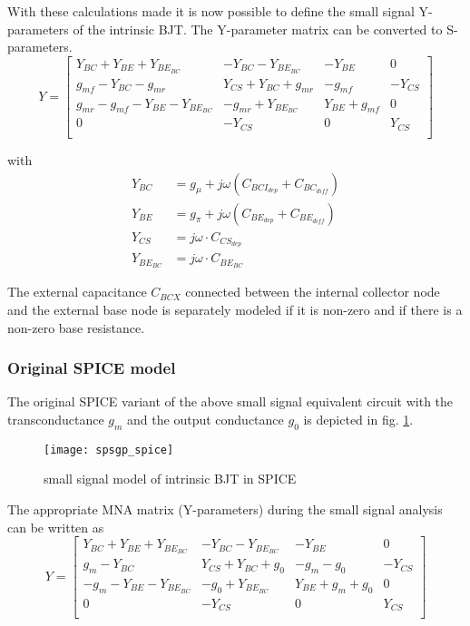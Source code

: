 With these calculations made it is now possible to define the small
signal Y-parameters of the intrinsic BJT.  The Y-parameter matrix can
be converted to S-parameters.
\begin{equation}
Y =
\begin{bmatrix}
Y_{BC} + Y_{BE} + Y_{BE_{BC}} & -Y_{BC} - Y_{BE_{BC}}& -Y_{BE} & 0\\
g_{mf} - Y_{BC} - g_{mr} & Y_{CS} + Y_{BC} + g_{mr}& - g_{mf} & -Y_{CS}\\
g_{mr} - g_{mf} - Y_{BE} - Y_{BE_{BC}} & -g_{mr} + Y_{BE_{BC}} & Y_{BE} + g_{mf} & 0\\
0 & -Y_{CS} & 0 & Y_{CS}\\
\end{bmatrix}
\end{equation}

with
\begin{align}
Y_{BC} &= g_{\mu} + j\omega \left(C_{BCI_{dep}} + C_{BC_{diff}}\right)\\
Y_{BE} &= g_{\pi} + j\omega \left(C_{BE_{dep}} + C_{BE_{diff}}\right)\\
Y_{CS} &= j\omega\cdot C_{CS_{dep}}\\
Y_{BE_{BC}} &= j\omega\cdot C_{BE_{BC}}
\end{align}

The external capacitance $C_{BCX}$ connected between the internal
collector node and the external base node is separately modeled if it
is non-zero and if there is a non-zero base resistance.

\subsubsection{Original SPICE model}

The original SPICE variant of the above small signal equivalent
circuit with the transconductance $g_m$ and the output conductance
$g_0$ is depicted in fig. \ref{fig:spsgp_spice}.

\begin{figure}[ht]
\begin{center}
\texttt{[image: spsgp\_spice]}
\end{center}
\caption{small signal model of intrinsic BJT in SPICE}
\label{fig:spsgp_spice}
\end{figure}
\FloatBarrier

The appropriate MNA matrix (Y-parameters) during the small signal
analysis can be written as
\begin{equation}
Y =
\begin{bmatrix}
Y_{BC} + Y_{BE} +Y_{BE_{BC}} & -Y_{BC} - Y_{BE_{BC}} & -Y_{BE} & 0\\
g_{m} - Y_{BC} & Y_{CS} + Y_{BC} + g_{0} & - g_{m} - g_{0} & -Y_{CS}\\
- g_{m} - Y_{BE} - Y_{BE_{BC}} & -g_{0} + Y_{BE_{BC}} & Y_{BE} + g_{m} + g_{0} & 0\\
0 & -Y_{CS} & 0 & Y_{CS}\\
\end{bmatrix}
\end{equation}

